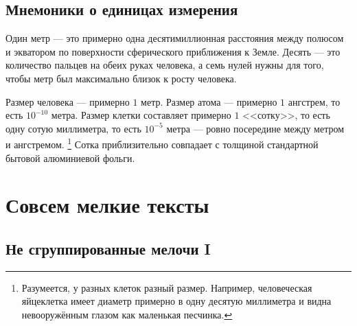 \documentclass[
	extrafontsizes,
	11pt,
	hyphens,
]{memoir}
\begin{document}
%


\section{Мнемоники о единицах измерения}

\begin{observation}
Один метр --- это примерно одна десятимиллионная расстояния между полюсом и экватором по поверхности сферического приближения к Земле.
Десять --- это количество пальцев на обеих руках человека, а семь нулей нужны для того, чтобы метр был максимально близок к росту человека.
\end{observation}

\begin{observation}
Размер человека --- примерно \(1\) метр.
Размер атома --- примерно \(1\) ангстрем, то есть \(10^{-10}\) метра.
Размер клетки составляет примерно \(1\) <<сотку>>, то есть одну сотую миллиметра, то есть \(10^{-5}\) метра --- ровно посередине между метром и ангстремом.%
\footnote{Разумеется, у разных клеток разный размер. Например, человеческая яйцеклетка имеет диаметр примерно в одну десятую миллиметра и видна невооружённым глазом как маленькая песчинка.}
Сотка приблизительно совпадает с толщиной стандартной бытовой алюминиевой фольги.
\end{observation}



\chapter{Совсем мелкие тексты}


\section{Не сгруппированные мелочи I}
\end{document}
